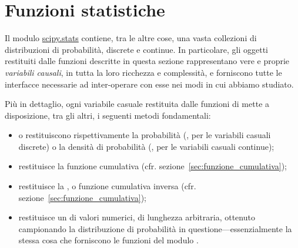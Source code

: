 \section{Funzioni statistiche}

Il modulo \href{https://docs.scipy.org/doc/scipy/reference/stats.html}{scipy.stats}
contiene, tra le altre cose, una vasta collezioni di distribuzioni di probabilità,
discrete e continue. In particolare, gli oggetti restituiti dalle funzioni
descritte in questa sezione rappresentano vere e proprie \emph{variabili causali},
in tutta la loro ricchezza e complessità, e forniscono tutte le interfacce
necessarie ad inter-operare con esse nei modi in cui abbiamo studiato.

Più in dettaglio, ogni variabile casuale restituita dalle funzioni di 
mette a disposizione, tra gli altri, i seguenti metodi fondamentali:
\begin{itemize}
  \item {} o  restituiscono rispettivamente la probabilità
  (, per le variabili casuali discrete) o la
  densità di probabilità (, per le variabili
  casuali continue);
  \item {} restituisce la funzione cumulativa
  (cfr. sezione~\ref{sec:funzione_cumulativa});
  \item {} restituisce la , o funzione
  cumulativa inversa (cfr. sezione~\ref{sec:funzione_cumulativa});
  \item {} restituisce un  di valori numerici, di lunghezza
  arbitraria, ottenuto campionando la distribuzione di probabilità in
  questione---essenzialmente la stessa cosa che forniscono le funzioni del
  modulo .
\end{itemize}




